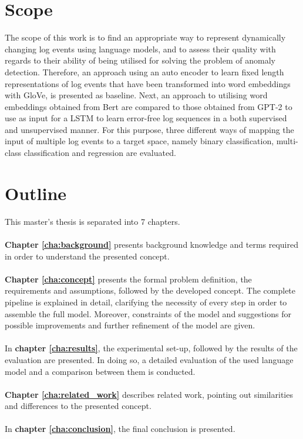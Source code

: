 \section{Scope\label{sec:scope}}
The scope of this work is to find an appropriate way to represent dynamically changing log events using language models, and to assess their quality with regards to their ability of being utilised for solving the problem of anomaly detection. Therefore, an approach using an auto encoder to learn fixed length representations of log events that have been transformed into word embeddings with GloVe, is presented as baseline. Next, an approach to utilising word embeddings obtained from Bert are compared to those obtained from GPT-2 to use as input for a LSTM to  learn error-free log sequences in a both supervised and unsupervised manner. For this purpose, three different ways of mapping the input of multiple log events to a target space, namely binary classification, multi-class classification and regression are evaluated.


\section{Outline\label{sec:outline}}


This master's thesis is separated into 7 chapters.
\\
\\
\textbf{Chapter \ref{cha:background}} presents background knowledge and terms required in order to understand the presented concept.
\\
\\
\textbf{Chapter \ref{cha:concept}} presents the formal problem definition, the requirements and assumptions, followed by the developed concept. The complete pipeline is explained in detail, clarifying the necessity of every step in order to assemble the full model. Moreover, constraints of the model and suggestions for possible improvements and further refinement of the model are given.
\\
\\
In \textbf{chapter \ref{cha:results}}, the experimental set-up, followed by the results of the evaluation are presented. In doing so, a detailed evaluation of the used language model and a comparison between them is conducted.
\\
\\
\textbf{Chapter \ref{cha:related_work}} describes related work, pointing out similarities and differences to the presented concept.
\\
\\
In \textbf{chapter \ref{cha:conclusion}}, the final conclusion is presented.



